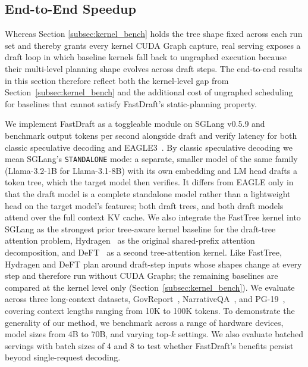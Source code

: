 \documentclass{article}
\begin{document}
 

\subsection{End-to-End Speedup}
\label{subsec:e2e_benchmark}
Whereas Section \ref{subsec:kernel_bench} holds the tree shape fixed across each run set and thereby grants every kernel CUDA Graph capture, real serving exposes a draft loop in which baseline kernels fall back to ungraphed execution because their multi-level planning shape evolves across draft steps. The end-to-end results in this section therefore reflect both the kernel-level gap from Section~\ref{subsec:kernel_bench} and the additional cost of ungraphed scheduling for baselines that cannot satisfy FastDraft's static-planning property.

We implement FastDraft as a toggleable module on SGLang v0.5.9 and benchmark output tokens per second alongside draft and verify latency for both classic speculative decoding and EAGLE3~\cite{li2025eaglespeculativesamplingrequires}. By classic speculative decoding we mean SGLang's \texttt{STANDALONE} mode: a separate, smaller model of the same family (Llama-3.2-1B for Llama-3.1-8B) with its own embedding and LM head drafts a token tree, which the target model then verifies. It differs from EAGLE only in that the draft model is a complete standalone model rather than a lightweight head on the target model's features; both draft trees, and both draft models attend over the full context KV cache. We also integrate the FastTree kernel into SGLang as the strongest prior tree-aware kernel baseline for the draft-tree attention problem, Hydragen~\cite{hydragen} as the original shared-prefix attention decomposition, and DeFT~\cite{yao2025deftdecodingflashtreeattention} as a second tree-attention kernel. Like FastTree, Hydragen and DeFT plan around draft-step inputs whose shapes change at every step and therefore run without CUDA Graphs; the remaining baselines are compared at the kernel level only (Section~\ref{subsec:kernel_bench}). We evaluate across three long-context datasets, GovReport~\cite{huang-etal-2021-efficient}, NarrativeQA~\cite{kočiský2017narrativeqareadingcomprehensionchallenge}, and PG-19~\cite{raecompressive2019}, covering context lengths ranging from 10K to 100K tokens. To demonstrate the generality of our method, we benchmark across a range of hardware devices, model sizes from 4B to 70B, and varying top-$k$ settings. We also evaluate batched servings with batch sizes of 4 and 8 to test whether FastDraft's benefits persist beyond single-request decoding.
\end{document}
